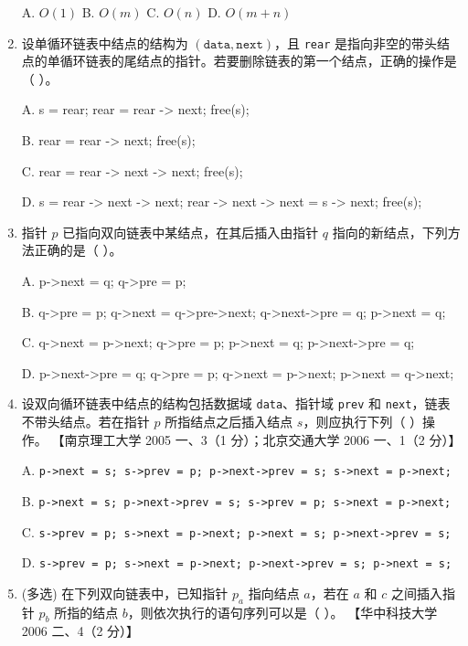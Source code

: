 \documentclass[lang=cn,newtx,10pt,scheme=chinese]{../../elegantbook}
\begin{document}
\begin{enumerate}
    A. $O(1)$ \quad B. $O(m)$ \quad C. $O(n)$ \quad D. $O(m+n)$  

    \item 设单循环链表中结点的结构为 $(\texttt{data}, \texttt{next})$，且 \texttt{rear} 是指向非空的带头结点的单循环链表的尾结点的指针。若要删除链表的第一个结点，正确的操作是（ ）。  
    
    A. s = rear; rear = rear -> next; free(s);

    B. rear = rear -> next; free(s);

    C. rear = rear -> next -> next; free(s);

    D. s = rear -> next -> next; rear -> next -> next = s -> next; free(s);

    \item 指针 $p$ 已指向双向链表中某结点，在其后插入由指针 $q$ 指向的新结点，下列方法正确的是（ ）。  
    
    A. p->next = q; q->pre = p;
    
    B. q->pre = p; q->next = q->pre->next; q->next->pre = q; p->next = q;
   
    C. q->next = p->next; q->pre = p; p->next = q; p->next->pre = q;
   
    D. p->next->pre = q; q->pre = p; q->next = p->next; p->next = q->next;

    \item 设双向循环链表中结点的结构包括数据域 \texttt{data}、指针域 \texttt{prev} 和 \texttt{next}，链表不带头结点。若在指针 $p$ 所指结点之后插入结点 $s$，则应执行下列（ ）操作。  
    【南京理工大学 2005 一、3（1 分）；北京交通大学 2006 一、1（2 分）】 

    A. \texttt{p->next = s; s->prev = p; p->next->prev = s; s->next = p->next;} 

    B. \texttt{p->next = s; p->next->prev = s; s->prev = p; s->next = p->next;} 

    C. \texttt{s->prev = p; s->next = p->next; p->next = s; p->next->prev = s;}  

    D. \texttt{s->prev = p; s->next = p->next; p->next->prev = s; p->next = s;}  

    \item (多选) 在下列双向链表中，已知指针 $p_a$ 指向结点 $a$，若在 $a$ 和 $c$ 之间插入指针 $p_b$ 所指的结点 $b$，则依次执行的语句序列可以是（ ）。  
    【华中科技大学 2006 二、4（2 分）】  


\end{enumerate}
\end{document}
